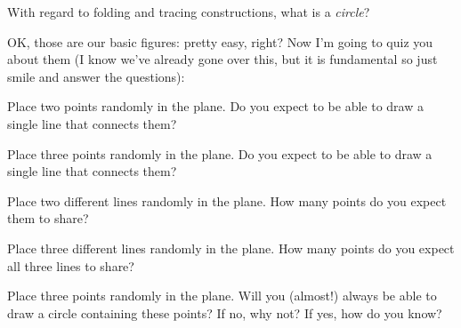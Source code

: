 \begin{ques}
With regard to folding and tracing constructions, what is a \textit{circle}?
\end{ques}
\QM


OK, those are our basic figures: pretty easy, right? Now I'm going to
quiz you about them (I know we've already gone over this, but it is
fundamental so just smile and answer the questions):

\begin{ques} 
Place two points randomly in the plane. Do you expect to be able to
draw a single line that connects them?
\end{ques}
\QM

\begin{ques} 
Place three points randomly in the plane. Do you expect to be able to
draw a single line that connects them?
\end{ques}
\QM

\begin{ques} 
Place two different lines randomly in the plane. How many points do you expect
them to share?
\end{ques}
\QM


\begin{ques} 
Place three different lines randomly in the plane. How many points do you expect
all three lines to share?
\end{ques}
\QM


\begin{ques} 
Place three points randomly in the plane. Will you (almost!) always be
able to draw a circle containing these points? If no, why not? If yes,
how do you know?
\end{ques}
\QM


%
%
%
%
%


